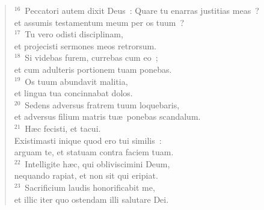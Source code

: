 \begin{verse}
${}^{16}$~Peccatori autem dixit Deus~: Quare tu enarras justitias meas~?\\ et assumis testamentum meum per os tuum~?\\
${}^{17}$~Tu vero odisti disciplinam,\\ et projecisti sermones meos retrorsum.\\
${}^{18}$~Si videbas furem, currebas cum eo~;\\ et cum adulteris portionem tuam ponebas.\\
${}^{19}$~Os tuum abundavit malitia,\\ et lingua tua concinnabat dolos.\\
${}^{20}$~Sedens adversus fratrem tuum loquebaris,\\ et adversus filium matris tu\ae\ ponebas scandalum.\\
${}^{21}$~H\ae c fecisti, et tacui.\\ Existimasti inique quod ero tui similis~:\\ arguam te, et statuam contra faciem tuam.\\
${}^{22}$~Intelligite h\ae c, qui obliviscimini Deum,\\ nequando rapiat, et non sit qui eripiat.\\
${}^{23}$~Sacrificium laudis honorificabit me,\\ et illic iter quo ostendam illi salutare Dei.\end{verse}



